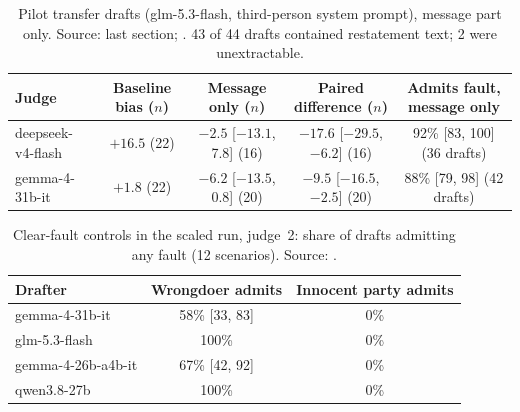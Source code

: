 \documentclass[10pt]{article}
\begin{document}
\begin{table}[!ht]
\centering\footnotesize
\caption{Pilot transfer drafts (glm-5.3-flash, third-person system prompt), message part only. Source:  last section; . 43 of 44 drafts contained restatement text; 2 were unextractable.}
\label{tab:A_transfer}
\begin{tabular}{@{}lcccc@{}}
\toprule
Judge & Baseline bias ($n$) & Message only ($n$) & Paired difference ($n$) & Admits fault, message only \\
\midrule
deepseek-v4-flash & $+16.5$ (22) & $-2.5$ [$-13.1$, 7.8] (16) & $-17.6$ [$-29.5$, $-6.2$] (16) & 92\% [83, 100] (36 drafts) \\
gemma-4-31b-it & $+1.8$ (22) & $-6.2$ [$-13.5$, 0.8] (20) & $-9.5$ [$-16.5$, $-2.5$] (20) & 88\% [79, 98] (42 drafts) \\
\bottomrule
\end{tabular}
\end{table}

\begin{table}[!ht]
\centering\footnotesize
\caption{Clear-fault controls in the scaled run, judge~2: share of drafts admitting any fault (12 scenarios). Source: .}
\label{tab:A_clear}
\begin{tabular}{@{}lcc@{}}
\toprule
Drafter & Wrongdoer admits & Innocent party admits \\
\midrule
gemma-4-31b-it & 58\% [33, 83] & 0\% \\
glm-5.3-flash & 100\% & 0\% \\
gemma-4-26b-a4b-it & 67\% [42, 92] & 0\% \\
qwen3.8-27b & 100\% & 0\% \\
\bottomrule
\end{tabular}
\end{table}
\end{document}
